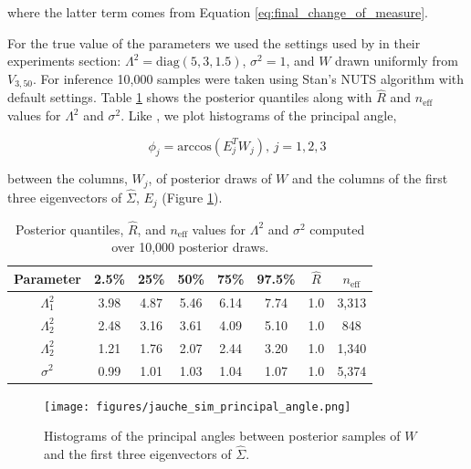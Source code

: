 \documentclass[ba]{imsart}
\numberwithin{equation}{section}
\theoremstyle{plain}
\begin{document}
\noindent where the latter term comes from Equation \ref{eq:final_change_of_measure}.

\noindent For the true value of the parameters we used the settings used by \citet{jauch2018random} in their experiments section: $\Lambda^2 = \mathrm{diag}(5, 3, 1.5)$, $\sigma^2 = 1$, and $W$ drawn uniformly from $V_{3, 50}$. For inference 10,000 samples were taken using Stan's NUTS algorithm with default settings. Table \ref{tab:ppca50} shows the posterior quantiles along with $\hat{R}$ and $n_{\mathrm{eff}}$ values for $\Lambda^2$ and $\sigma^2$. Like \citet{jauch2018random}, we plot histograms of the principal angle,

\begin{equation}
\phi_j = \mathrm{arccos}(E_j^T W_j),\, j=1,2,3
\end{equation}

\noindent between the columns, $W_j$, of posterior draws of $W$ and the columns of the first three eigenvectors of $\hat{\Sigma}$, $E_j$ (Figure \ref{fig:ppca50_principal_angle}).

\begin{table}
\begin{tabular}{|c||ccccccc|}
\hline
Parameter & 2.5\% & 25\% & 50\% & 75\% & 97.5\% &  $\hat{R}$ & $n_{\mathrm{eff}}$\\
\hline
\hline
$\Lambda_1^2$  & 3.98 & 4.87 & 5.46 & 6.14 & 7.74 & 1.0 & 3,313\\
$\Lambda_2^2$  & 2.48 & 3.16 & 3.61 & 4.09 & 5.10 & 1.0 & 848\\
$\Lambda_2^2$  & 1.21 & 1.76 & 2.07 & 2.44 & 3.20 & 1.0 & 1,340 \\
$\sigma^2$ & 0.99 & 1.01 & 1.03 & 1.04 & 1.07 & 1.0 & 5,374\\
\hline
\end{tabular}
\caption{Posterior quantiles, $\hat{R}$, and $n_{\mathrm{eff}}$ values for $\Lambda^2$ and $\sigma^2$ computed over 10,000 posterior draws.}
\label{tab:ppca50}
\end{table}

\begin{figure}[h]
\centering
\vspace{.1in}
\texttt{[image: figures/jauche\_sim\_principal\_angle.png]}
\vspace{.05in}
\caption{Histograms of the principal angles between posterior samples of $W$ and the first three eigenvectors of $\hat{\Sigma}$.}
\label{fig:ppca50_principal_angle}
\end{figure}
\end{document}
